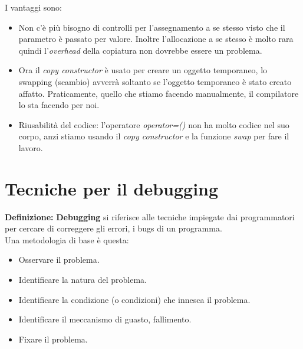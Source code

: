 \textsf{\small I vantaggi sono: } \\

\begin{itemize} %
	\item \textsf{\small Non c'è più bisogno di controlli per l'assegnamento a se stesso visto che il parametro è passato per valore. Inoltre l'allocazione a se stesso è molto rara quindi l'\emph{overhead} della copiatura non dovrebbe essere un problema.}
	\item \textsf{\small Ora il \emph{copy constructor} è usato per creare un oggetto temporaneo, lo swapping (scambio) avverrà soltanto se l'oggetto temporaneo è stato creato affatto. Praticamente, quello che stiamo facendo manualmente, il compilatore lo sta facendo per noi.}
	\item \textsf{\small Riusabilità del codice: l'operatore \emph{operator=()} non ha molto codice nel suo corpo, anzi stiamo usando il \emph{copy constructor} e la funzione \emph{swap} per fare il lavoro.}
\end{itemize}



\newpage

\section{Tecniche per il debugging}

\textsf{\small \textbf{Definizione: } \textbf{Debugging} si riferisce alle tecniche impiegate dai programmatori per cercare di correggere gli errori, i bugs di un programma.} \\

\textsf{\small Una metodologia di base è questa: } \\

\begin{itemize}
	\item \textsf{\small Osservare il problema.}
	\item \textsf{\small Identificare la natura del problema.}
	\item \textsf{\small Identificare la condizione (o condizioni) che innesca il problema.}
	\item \textsf{\small Identificare il meccanismo di guasto, fallimento.}
	\item \textsf{\small Fixare il problema.}
\end{itemize}


